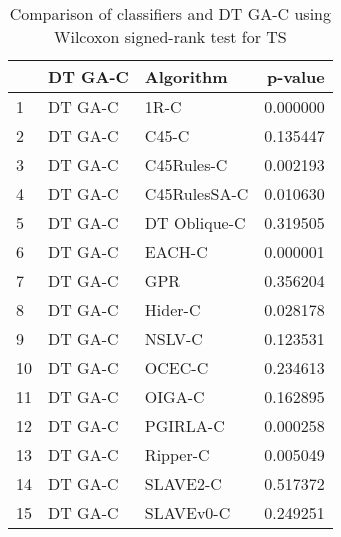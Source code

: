 \begin{table}
\footnotesize
\caption{Comparison of classifiers and DT GA-C using Wilcoxon signed-rank test for TS}
\label{tab:DT GA-C wilcoxon TS comparison}
\begin{tabular}{lllr}
\hline
 & DT GA-C & Algorithm & p-value \\
\hline
1 & DT GA-C & 1R-C & 0.000000 \\
2 & DT GA-C & C45-C & 0.135447 \\
3 & DT GA-C & C45Rules-C & 0.002193 \\
4 & DT GA-C & C45RulesSA-C & 0.010630 \\
5 & DT GA-C & DT Oblique-C & 0.319505 \\
6 & DT GA-C & EACH-C & 0.000001 \\
7 & DT GA-C & GPR & 0.356204 \\
8 & DT GA-C & Hider-C & 0.028178 \\
9 & DT GA-C & NSLV-C & 0.123531 \\
10 & DT GA-C & OCEC-C & 0.234613 \\
11 & DT GA-C & OIGA-C & 0.162895 \\
12 & DT GA-C & PGIRLA-C & 0.000258 \\
13 & DT GA-C & Ripper-C & 0.005049 \\
14 & DT GA-C & SLAVE2-C & 0.517372 \\
15 & DT GA-C & SLAVEv0-C & 0.249251 \\
\hline
\end{tabular}
\end{table}
